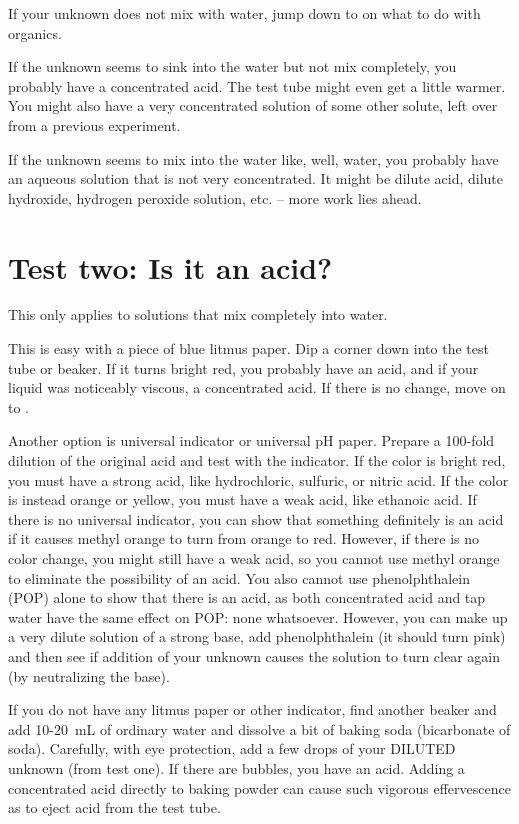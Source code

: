 If your unknown does not mix with water, 
jump down to  on what to do with organics.

If the unknown seems to sink into the water but not mix completely, 
you probably have a concentrated acid. 
The test tube might even get a little warmer. 
You might also have a very concentrated solution of some other solute, 
left over from a previous experiment.

If the unknown seems to mix into the water like, 
well, 
water, 
you probably have an aqueous solution that is not very concentrated. 
It might be dilute acid, 
dilute hydroxide, 
hydrogen peroxide solution, 
etc. -- more work lies ahead.

\section{Test two: Is it an acid?}

This only applies to solutions that mix completely into water.

This is easy with a piece of blue litmus paper. 
Dip a corner down into the test tube or beaker. 
If it turns bright red, 
you probably have an acid, 
and if your liquid was noticeably viscous, 
a concentrated acid. 
If there is no change, 
move on to .

Another option is universal indicator or universal pH paper. 
Prepare a 100-fold dilution of the original acid 
and test with the indicator. 
If the color is bright red, 
you must have a strong acid, 
like hydrochloric, 
sulfuric, 
or nitric acid. 
If the color is instead orange or yellow, 
you must have a weak acid, 
like ethanoic acid. 
If there is no universal indicator, 
you can show that something definitely is an acid 
if it causes methyl orange to turn from orange to red. 
However, if there is no color change, you might still have a weak acid, so you cannot use methyl orange to eliminate the possibility of an acid. You also cannot use phenolphthalein (POP) alone to show that there is an acid, as both concentrated acid and tap water have the same effect on POP: none whatsoever. However, you can make up a very dilute solution of a strong base, add phenolphthalein (it should turn pink) and then see if addition of your unknown causes the solution to turn clear again (by neutralizing the base).

If you do not have any litmus paper or other indicator, 
find another beaker and add 10-20~mL of ordinary water 
and dissolve a bit of baking soda (bicarbonate of soda). 
Carefully, 
with eye protection, 
add a few drops of your DILUTED unknown (from test one). 
If there are bubbles, 
you have an acid. 
Adding a concentrated acid directly to baking powder 
can cause such vigorous effervescence as to eject acid from the test tube.

